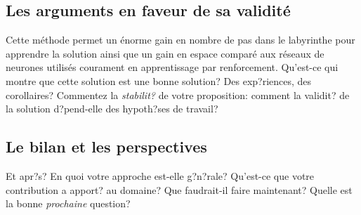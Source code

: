 \documentclass{article}
\newenvironment{point}[1]%
{\subsection*{#1}}%
{}
\begin{document}
\begin{point}{Les arguments en faveur de sa validité}
Cette méthode permet un énorme gain en nombre de pas dans le labyrinthe pour apprendre la solution ainsi que un gain en espace comparé aux réseaux de neurones utilisés courament en apprentissage par renforcement.
  Qu'est-ce qui montre que cette solution est une bonne solution? Des
  exp?riences, des corollaires? Commentez la \emph{stabilit?} de votre
  proposition: comment la validit? de la solution d?pend-elle des
  hypoth?ses de travail?

\end{point}


\begin{point}{Le bilan et les perspectives}
  
  Et apr?s? En quoi votre approche est-elle g?n?rale? Qu'est-ce que
  votre contribution a apport? au domaine? Que faudrait-il faire
  maintenant? Quelle est la bonne \emph{prochaine} question?

\end{point}
\end{document}
